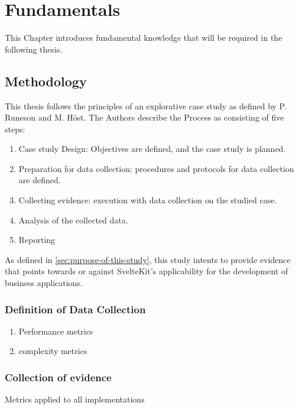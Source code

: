 \chapter{Fundamentals}
\label{ch:fundamentals}



This Chapter introduces fundamental knowledge that will be required in the following thesis.


\section{Methodology}
\label{sec:methodology}

This thesis follows the principles of an explorative case study as defined by P. Runeson and M. Höst\cite{runeson_guidelines_2009}. The Authors describe the Process as consisting of five steps:

\begin{enumerate}
    \item Case study Design: Objectives are defined, and the case study is planned.
    \item Preparation for data collection: procedures and protocols for data collection are defined.
    \item Collecting evidence: execution with data collection on the studied case.
    \item Analysis of the collected data.
    \item Reporting
\end{enumerate}

As defined in \ref{sec:purpose-of-this-study}, this study intents to provide evidence that points towards or against SvelteKit's applicability for the development of business applications.

\subsection{Definition of Data Collection}
\begin{enumerate}
    \item Performance metrics
    \item complexity metrics
\end{enumerate}

\subsection{Collection of evidence}

Metrics applied to all implementations


